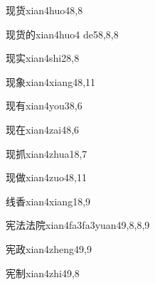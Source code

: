 \begin{verbete}{现货}{xian4huo4}{8,8}
\end{verbete}

\begin{verbete}{现货的}{xian4huo4 de5}{8,8,8}
\end{verbete}

\begin{verbete}{现实}{xian4shi2}{8,8}
\end{verbete}

\begin{verbete}{现象}{xian4xiang4}{8,11}
\end{verbete}

\begin{verbete}{现有}{xian4you3}{8,6}
\end{verbete}

\begin{verbete}{现在}{xian4zai4}{8,6}
\end{verbete}

\begin{verbete}{现抓}{xian4zhua1}{8,7}
\end{verbete}

\begin{verbete}{现做}{xian4zuo4}{8,11}
\end{verbete}

\begin{verbete}{线香}{xian4xiang1}{8,9}
\end{verbete}

\begin{verbete}{宪法法院}{xian4fa3fa3yuan4}{9,8,8,9}
\end{verbete}

\begin{verbete}{宪政}{xian4zheng4}{9,9}
\end{verbete}

\begin{verbete}{宪制}{xian4zhi4}{9,8}
\end{verbete}

